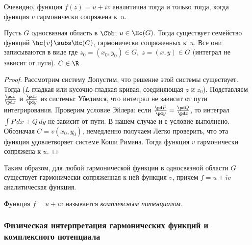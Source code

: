 \documentclass[a4paper]{article}
\begin{document}
\begin{theorem}
Очевидно, функция $f(z)=u+iv$ аналитична тогда и только тогда, когда функция $v$ гармонически сопряжена к~$u$.

\begin{stm}
Пусть  $G$ односвязная область в $\Cbb$; $u \in \Hc(G)$.
Тогда существует семейство функций $\hc{v} \subs \Hc(G)$, гармонически сопряженных к~$u$.
Все они записываются в виде
где $z_0=(x_0, y_0)\in G, \; z=(x,y)\in G$ (интеграл не зависит от пути). $C\in \R$
\end{stm}
\begin{proof}
Рассмотрим систему
Допустим,  что решение этой системы существует. Тогда
($L$ гладкая или кусочно-гладкая кривая, соединяющая $z$ и $z_0$). Подставляем
$\frac{\pd v}{\pd x}$ и $\frac{\pd v}{\pd y}$ из системы:
Убедимся, что интеграл не зависит от пути интегрирования. Проверим условие Эйлера: если
$\frac{\pd P}{\pd y}=\frac{\pd Q}{\pd x}$, то интеграл $\int P\,dx+Q\,dy$ не зависит от пути.
В нашем случае
и
е условие выполнено. Обозначая $C=v(x_0, y_0)$, немедленно получаем
Легко проверить, что эта функция удовлетворяет системе Коши Римана. Тогда функция $v$ гармонически сопряжена к $u$.
\end{proof}

Таким образом, для любой гармонической функции в односвязной области $G$ существует гармонически
сопряженная к ней функция $v$, причем $f=u+iv$ аналитическая функция.

\begin{df}
Функция $f=u+iv$ называется \emph{комплексным потенциалом}.
\end{df}

\subsubsection{Физическая интерпретация гармонических функций и комплексного потенциала}


\end{theorem}
\end{document}
